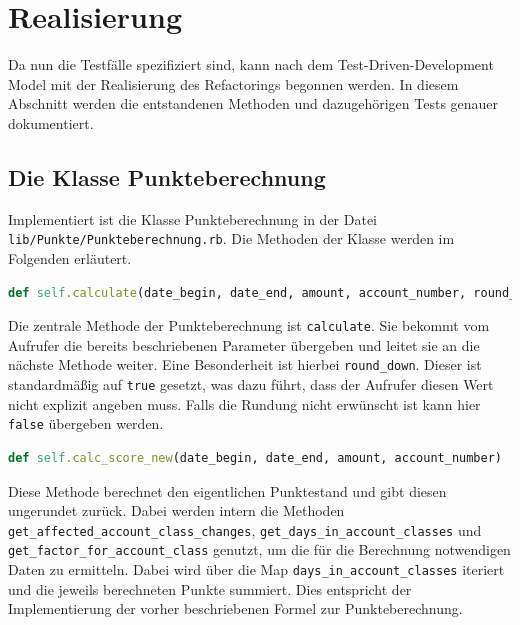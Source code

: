 \documentclass[12pt]{scrreprt}
\begin{document}
\section{Realisierung}

Da nun die Testfälle spezifiziert sind, kann nach dem Test-Driven-Development Model mit der Realisierung des Refactorings begonnen werden. In diesem Abschnitt werden die entstandenen Methoden und dazugehörigen Tests genauer dokumentiert.

\subsection{Die Klasse Punkteberechnung}

Implementiert ist die Klasse Punkteberechnung in der Datei \newline\verb+lib/Punkte/Punkteberechnung.rb+. Die Methoden der Klasse werden im Folgenden erläutert.\\

\begin{lstlisting}[language=Ruby]
def self.calculate(date_begin, date_end, amount, account_number, round_down = true)
\end{lstlisting}
Die zentrale Methode der Punkteberechnung ist \verb+calculate+. Sie bekommt vom Aufrufer die bereits beschriebenen Parameter übergeben und leitet sie an die nächste Methode weiter. Eine Besonderheit ist hierbei \verb+round_down+. Dieser ist standardmäßig auf \verb+true+ gesetzt, was dazu führt, dass der Aufrufer diesen Wert nicht explizit angeben muss. Falls die Rundung nicht erwünscht ist kann hier \verb+false+ übergeben werden. \\

\begin{lstlisting}[language=Ruby]
def self.calc_score_new(date_begin, date_end, amount, account_number)
\end{lstlisting}
Diese Methode berechnet den eigentlichen Punktestand und gibt diesen ungerundet zurück. Dabei werden intern die Methoden \verb+get_affected_account_class_changes+, \verb+get_days_in_account_classes+ und \verb+get_factor_for_account_class+ genutzt, um die für die Berechnung  notwendigen Daten zu ermitteln. Dabei wird über die Map \newline\verb+days_in_account_classes+ iteriert und die jeweils berechneten Punkte summiert. Dies entspricht der Implementierung der vorher beschriebenen Formel zur Punkteberechnung. \\
\end{document}
